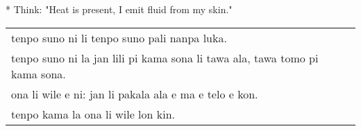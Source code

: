 * Think: "Heat is present, I emit fluid from my skin."

\begin{supertabular}{p{5,5cm}|ll}
    tenpo suno ni li tenpo suno pali nanpa luka.                                &  & \\ %
    tenpo suno ni la jan lili pi kama sona li tawa ala, tawa tomo pi kama sona. &  & \\ %
    ona li wile e ni: jan li pakala ala e ma e telo e kon.                      &  & \\ %
    tenpo kama la ona li wile lon kin.                                          &  & \\ %
\end{supertabular}

